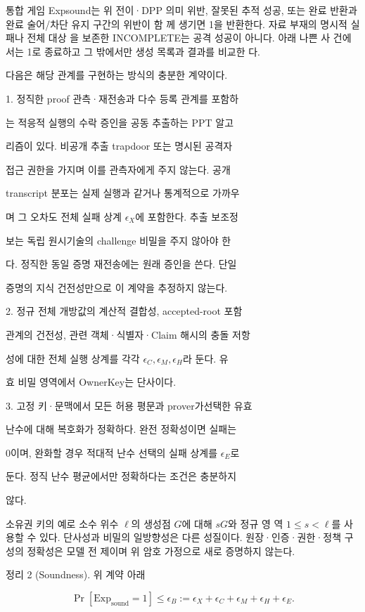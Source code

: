 통합 게임 Expsound는 위 전이·DPP 의미 위반, 잘못된 추적
성공, 또는 완료 반환과 완료 술어/차단 유지 구간의 위반이 함
께 생기면 1을 반환한다. 자료 부재의 명시적 실패나 전체 대상
을 보존한 INCOMPLETE는 공격 성공이 아니다. 아래 나쁜 사
건에서는 1로 종료하고 그 밖에서만 생성 목록과 결과를 비교한
다.

다음은 해당 관계를 구현하는 방식의 충분한 계약이다.

1. 정직한 proof 관측·재전송과 다수 등록 관계를 포함하

는 적응적 실행의 수락 증인을 공동 추출하는 PPT 알고

리즘이 있다. 비공개 추출 trapdoor 또는 명시된 공격자

접근 권한을 가지며 이를 관측자에게 주지 않는다. 공개

transcript 분포는 실제 실행과 같거나 통계적으로 가까우

며 그 오차도 전체 실패 상계 \(\epsilon _{X}\)에 포함한다. 추출 보조정

보는 독립 원시기술의 challenge 비밀을 주지 않아야 한

다. 정직한 동일 증명 재전송에는 원래 증인을 쓴다. 단일

증명의 지식 건전성만으로 이 계약을 추정하지 않는다.

2. 정규 전체 개방값의 계산적 결합성, accepted-root 포함

관계의 건전성, 관련 객체·식별자·Claim 해시의 충돌 저항

성에 대한 전체 실행 상계를 각각 \(\epsilon _{C},\epsilon _{M},\epsilon _{H}\)라 둔다. 유

효 비밀 영역에서 OwnerKey는 단사이다.

3. 고정 키·문맥에서 모든 허용 평문과 prover가선택한 유효

난수에 대해 복호화가 정확하다. 완전 정확성이면 실패는

0이며, 완화할 경우 적대적 난수 선택의 실패 상계를 \(\epsilon _{E}\)로

둔다. 정직 난수 평균에서만 정확하다는 조건은 충분하지

않다.

소유권 키의 예로 소수 위수 \(\ell \)의 생성점 \(G\)에 대해 \(sG\)와 정규 영
역 \(1≤s<\ell \)를 사용할 수 있다. 단사성과 비밀의 일방향성은
다른 성질이다. 원장·인증·권한·정책 구성의 정확성은 모델 전
제이며 위 암호 가정으로 새로 증명하지 않는다.

정리 2 (Soundness). 위 계약 아래

\begin{equation}
    \Pr[\mathrm{Exp}_{\mathrm{sound}}=1]\le\epsilon_B:=\epsilon_X+\epsilon_C+\epsilon_M+\epsilon_H+\epsilon_E.\tag{24}
\end{equation}

